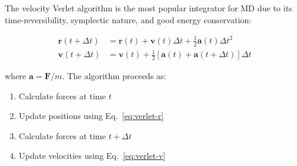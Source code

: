 \documentclass[11pt,a4paper]{article}
\newcommand{\vect}[1]{\mathbf{#1}}
\begin{document}
The velocity Verlet algorithm is the most popular integrator for MD due to its time-reversibility, symplectic nature, and good energy conservation:

\begin{align}
\vect{r}(t + \Delta t) &= \vect{r}(t) + \vect{v}(t)\Delta t + \frac{1}{2}\vect{a}(t)\Delta t^2 \label{eq:verlet-r}\\
\vect{v}(t + \Delta t) &= \vect{v}(t) + \frac{1}{2}[\vect{a}(t) + \vect{a}(t + \Delta t)]\Delta t \label{eq:verlet-v}
\end{align}

where $\vect{a} = \vect{F}/m$. The algorithm proceeds as:
\begin{enumerate}
    \item Calculate forces at time $t$
    \item Update positions using Eq.~\eqref{eq:verlet-r}
    \item Calculate forces at time $t + \Delta t$
    \item Update velocities using Eq.~\eqref{eq:verlet-v}
\end{enumerate}
\end{document}
